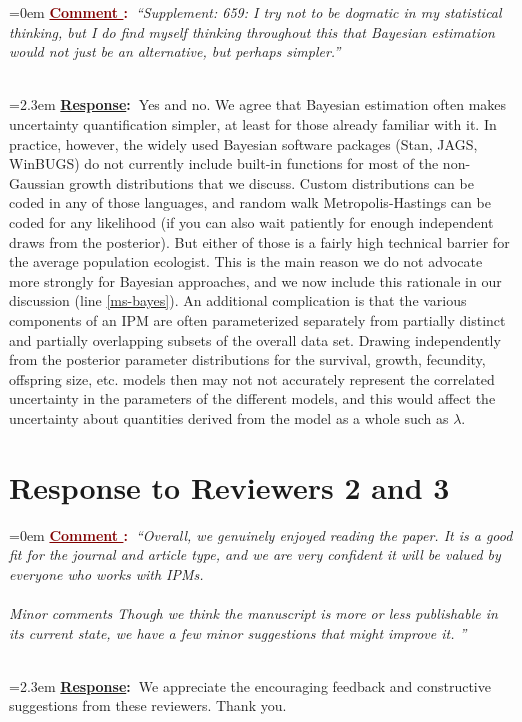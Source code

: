\documentclass[12pt]{article}
\newcounter{cN}
\newcommand{\comment}[1]{
	\vspace{2em}
	\refstepcounter{cN} %
	\noindent \hangindent=0em \textbf{\textcolor{Maroon}{\uline{Comment \thecN}:~}}\emph{``#1''}
	}
\newcommand{\response}[1]{
	\\[0.25em]
	\hangindent=2.3em \textbf{\textcolor{NavyBlue}{\uline{Response}:~}}#1
	}
\begin{document}
\comment{Supplement: 659: I try not to be dogmatic in my statistical thinking, but I do find myself thinking throughout this that Bayesian estimation would not just be an alternative, but perhaps simpler.}
\response{Yes and no. We agree that Bayesian estimation often makes uncertainty quantification simpler, at least for those already familiar with it. In practice, however, the widely used Bayesian software packages (Stan, JAGS, WinBUGS) do not currently include built-in functions for most of the non-Gaussian growth distributions that we discuss. Custom distributions can be coded in any of those languages, and random walk Metropolis-Hastings can be coded for any likelihood (if you can also wait patiently for enough independent draws from the posterior). But either of those is a fairly high technical barrier for the average population ecologist. This is the main reason we do not advocate more strongly for Bayesian approaches, and we now include this rationale in our discussion (line \ref{ms-bayes}). 
An additional complication is that the various components of an IPM are often parameterized separately from partially distinct and partially overlapping subsets of the overall data set. 
Drawing independently from the posterior parameter distributions for the survival, growth, fecundity, offspring size, etc. models then may not not accurately represent the correlated uncertainty in the parameters of the different models, and this would affect the uncertainty about quantities derived from the model as a whole such as $\lambda$. }

\section{Response to Reviewers 2 and 3}
\vspace{-2em}

\comment{Overall, we genuinely enjoyed reading the paper. It is a good fit for the journal and article type, and we are very confident it will be valued by everyone who works with IPMs.
\\
\\
Minor comments
Though we think the manuscript is more or less publishable in its current state, we have a few minor suggestions that might improve it.
}
\response{We appreciate the encouraging feedback and constructive suggestions from these reviewers. Thank you.}
\end{document}
